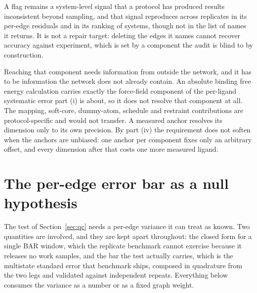 A flag remains a
system-level signal that a protocol has produced results inconsistent beyond sampling, and that
signal reproduces across replicates in its per-edge residuals and in its ranking of systems, though
not in the list of names it returns. It is not a repair target: deleting the edges it names cannot
recover accuracy against experiment, which is set by a component the audit is blind to by
construction.

Reaching that component needs information from outside the network, and it has to be information
the network does not already contain. An absolute binding free energy calculation carries exactly
the force-field component of the per-ligand systematic error part (i) is about, so it does not
resolve that component at all. The mapping, soft-core, dummy-atom, schedule and restraint
contributions are protocol-specific and would not transfer. A measured anchor resolves its dimension only to its own
precision. By part (iv) the requirement does not soften when the anchors are unbiased:
one anchor per component fixes only an arbitrary offset, and every dimension after that costs one
more measured ligand.

\section{The per-edge error bar as a null hypothesis}\label{sec:bar}
The test of Section~\ref{sec:qc} needs a per-edge variance it can treat as known. Two quantities
are involved, and they are kept apart throughout: the closed form for a single BAR window, which
the replicate benchmark cannot exercise because it releases no work samples, and the bar the test
actually carries, which is the multistate standard error that benchmark ships, composed in
quadrature from the two legs and validated against independent repeats. Everything below
consumes the variance as a number or as a fixed graph weight.

